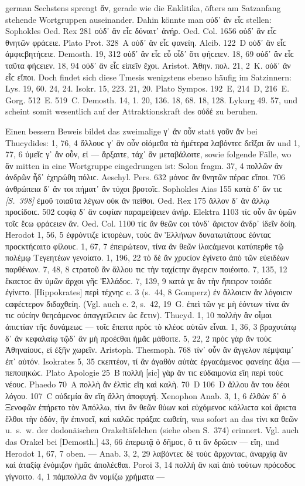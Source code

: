 \begin{otherlanguage*}{german}
Sechstens sprengt ἄν, gerade wie die Enklitika, öfters am Satzanfang stehende Wortgruppen auseinander. Dahin könnte man οὐδ᾽ ἂν εἷϲ stellen: Sophokles Oed. Rex 281 οὐδ᾽ ἂν εἷϲ δύναιτ᾽ ἀνήρ. Oed. Col. 1656 οὐδ᾽ ἂν εἷϲ θνητῶν φράϲειε. Plato Prot. 328~Α οὐδ᾽ ἂν εἷϲ φανείη. Alcib. 122~D οὐδ᾽ ἂν εἷϲ ἀμφιϲβητήϲειε. Demosth. 19, 312 οὐδ᾽ ἂν εἷϲ εὖ οἶδ᾽ ὅτι φήϲειεν. 18, 69 οὐδ᾽ ἂν εἷϲ ταῦτα φήϲειεν. 18, 94 οὐδ᾽ ἂν εἷϲ εἰπεῖν ἔχοι. Aristot. Ἀθην. πολ. 21, 2~Κ. οὐδ᾽ ἂν εἷϲ εἴποι. Doch findet sich diese Tmesis wenigstens ebenso häufig im Satzinnern: Lys. 19, 60. 24, 24. Isokr. 15, 223. 21, 20. Plato Sympos. 192~E, 214~D, 216~E. Gorg. 512~E. 519~C. Demosth. 14, 1. 20, 136. 18, 68. 18, 128. Lykurg 49. 57, und scheint somit wesentlich auf der Attraktionskraft des οὐδέ zu beruhen.

Einen bessern Beweis bildet das zweimalige γ᾽ ἂν οὖν statt γοῦν ἄν bei Thucydides: 1, 76, 4 ἄλλουϲ γ᾽ ἂν οὖν οἰόμεθα τὰ ἡμέτερα λαβόντεϲ δεῖξαι ἄν und 1, 77, 6 ὑμεῖϲ γ᾽ ἂν οὖν, εἰ — ἄρξαιτε, τάχ᾽ ἂν μεταβάλοιτε, sowie folgende Fälle, wo ἄν mitten in eine Wortgruppe eingedrungen ist: Solon fragm. 37, 4 πολλῶν ἂν ἀνδρῶν ἧδ᾽ ἐχηρώθη πόλιϲ. Aeschyl. Pers. 632 μόνοϲ ἂν θνητῶν πέραϲ εἴποι. 706 ἀνθρώπεια δ᾽ ἄν τοι πήματ᾽ ἂν τύχοι βροτοῖϲ. Sophokles Aias 155 κατὰ δ᾽ ἄν τιϲ \hypertarget{p398}{\emph{[S.~398]}}\label{p398} ἐμοῦ τοιαῦτα λέγων οὐκ ἂν πείθοι. Oed. Rex 175 ἄλλον δ᾽ ἂν ἄλλῳ προϲίδοιϲ. 502 ϲοφίᾳ δ᾽ ἂν ϲοφίαν παραμείψειεν ἀνήρ. Elektra 1103 τίϲ οὖν ἂν ὑμῶν τοῖϲ ἔϲω φράϲειεν ἄν. Oed. Col. 1100 τίϲ ἂν θεῶν ϲοι τόνδ᾽ ἄριϲτον ἄνδρ᾽ ἰδεῖν δοίη. Herodot 1, 56, 5 ἐφρόντιζε ἱϲτορέων, τοὺϲ ἂν Ἑλλήνων δυνατωτάτουϲ ἐόνταϲ προϲκτήϲαιτο φίλουϲ. 1, 67, 7 ἐπειρώτεον, τίνα ἂν θεῶν ἱλαϲάμενοι κατύπερθε τῷ πολέμῳ Τεγεητέων γενοίατο. 1, 196, 22 τὸ δὲ ἂν χρυϲίον ἐγίνετο ἀπὸ τῶν εὐειδέων παρθένων. 7, 48, 8 ϲτρατοῦ ἂν ἄλλου τιϲ τὴν ταχίϲτην ἄγερϲιν ποιέοιτο. 7, 135, 12 ἕκαϲτοϲ ἂν ὑμῶν ἄρχοι γῆϲ Ἑλλάδοϲ. 7, 139, 9 κατά γε ἂν τὴν ἤπειρον τοιάδε ἐγίνετο. [Hippokrates] περὶ τέχνηϲ c. 3 (s.~44, 8 Gomperz) ἐν ἄλλοιϲιν ἂν λόγοιϲιν ϲαφέϲτερον διδαχθείη. (Vgl. auch c. 2, s.~42, 19~G. ἐπεὶ τῶν γε μὴ ἐόντων τίνα ἄν τιϲ οὐϲίην θεηϲάμενοϲ ἀπαγγείλειεν ὡϲ ἔϲτιν). Thucyd. 1, 10 πολλὴν ἂν οἶμαι ἀπιϲτίαν τῆϲ δυνάμεωϲ — τοῖϲ ἔπειτα πρὸϲ τὸ κλέοϲ αὐτῶν εἶναι. 1, 36, 3 βραχυτάτῳ δ᾽ ἂν κεφαλαίῳ τῷδ᾽ ἂν μὴ προέϲθαι ἡμᾶϲ μάθοιτε. 5, 22, 2 πρὸϲ γὰρ ἂν τοὺϲ Ἀθηναίουϲ, εἰ ἐξῆν χωρεῖν. Aristoph. Thesmoph. 768 τίν᾽ οὖν ἂν ἄγγελον πέμψαιμ᾽ ἐπ᾽ αὐτόν. Isokrates 5, 35 ϲκεπτέον, τί ἂν ἀγαθὸν αὐτὰϲ ἐργαϲάμενοϲ φανείηϲ ἄξια — πεποιηκώϲ. Plato Apologie 25~B πολλή [sic] γὰρ ἄν τιϲ εὐδαιμονία εἴη περὶ τοὺϲ νέουϲ. Phaedo 70~Α πολλὴ ἂν ἐλπὶϲ εἴη καὶ καλὴ. 70~D 106~D ἄλλου ἄν του δέοι λόγου. 107~C οὐδεμία ἂν εἴη ἄλλη ἀποφυγή. Xenophon Anab. 3, 1, 6 ἐλθὼν δ᾽ ὁ Ξενοφῶν ἐπήρετο τὸν Ἀπόλλω, τίνι ἂν θεῶν θύων καὶ εὐχόμενοϲ κάλλιϲτα καὶ ἄριϲτα ἔλθοι τὴν ὁδόν, ἣν ἐπινοεῖ, καὶ καλῶϲ πράξαϲ ϲωθείη, was sofort an das τίνι κα θεῶν u.~s.~w. der dodonäischen Orakeltäfelchen (siehe oben S.~374) erinnert. Vgl. auch das Orakel bei [Demosth.] 43, 66 ἐπερωτᾷ ὁ δῆμοϲ, ὅ τι ἂν δρῶϲιν — εἵη, und Herodot 1, 67, 7 oben. — Anab. 3, 2, 29 λαβόντεϲ δὲ τοὺϲ ἄρχονταϲ, ἀναρχίᾳ ἂν καὶ ἀταξίᾳ ἐνόμιζον ἡμᾶϲ ἀπολέϲθαι. Poroi 3, 14 πολλὴ ἂν καὶ ἀπὸ τούτων πρόϲοδοϲ γίγνοιτο. 4, 1 πάμπολλα ἂν νομίζω χρήματα — 
\end{otherlanguage*}
